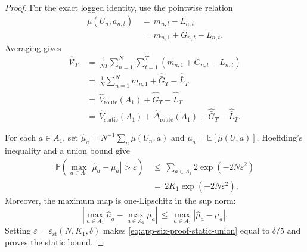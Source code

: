 \documentclass{article} %
\begin{document}
\begin{proof}
For the exact logged identity, use the pointwise relation
\begin{equation}
\label{eq:app-six-proof-sample-pointwise}
\begin{aligned}
\mu(U_n,a_{n,t})
&\,=\,
m_{n,t}-L_{n,t}
\\
&\,=\,
m_{n,1}+G_{n,t}-L_{n,t}.
\end{aligned}
\end{equation}
Averaging gives
\begin{equation}
\label{eq:app-six-proof-sample-average}
\begin{aligned}
\widehat{\mathcal{V}}_T
&\,=\,
\frac{1}{NT}\sum_{n=1}^{N}\sum_{t=1}^{T}
\left(m_{n,1}+G_{n,t}-L_{n,t}\right)
\\
&\,=\,
\frac{1}{N}\sum_{n=1}^{N}m_{n,1}
+
\widehat{\bar G}_T
-
\widehat{\bar L}_T
\\
&\,=\,
\widehat V_{\mathrm{route}}(A_1)
+
\widehat{\bar G}_T
-
\widehat{\bar L}_T
\\
&\,=\,
\widehat V_{\mathrm{static}}(A_1)
+
\widehat\Delta_{\mathrm{route}}(A_1)
+
\widehat{\bar G}_T
-
\widehat{\bar L}_T.
\end{aligned}
\end{equation}

For each \(a\in A_1\), set
\(\widehat\mu_a=N^{-1}\sum_n\mu(U_n,a)\) and
\(\mu_a=\mathbb E[\mu(U,a)]\). Hoeffding's inequality and a union bound give
\begin{equation}
\label{eq:app-six-proof-static-union}
\begin{aligned}
\mathbb{P}\!\left(
\max_{a\in A_1}|\widehat\mu_a-\mu_a|>\varepsilon
\right)
&\,\le\,
\sum_{a\in A_1}
2\exp(-2N\varepsilon^2)
\\
&\,=\,
2K_1\exp(-2N\varepsilon^2).
\end{aligned}
\end{equation}
Moreover, the maximum map is one-Lipschitz in the sup norm:
\begin{equation}
\left|
\max_{a\in A_1}\widehat\mu_a
-
\max_{a\in A_1}\mu_a
\right|
\,\leq\,
\max_{a\in A_1}|\widehat\mu_a-\mu_a|.
\end{equation}
Setting \(\varepsilon=\varepsilon_{\mathrm{st}}(N,K_1,\delta)\) makes
\eqref{eq:app-six-proof-static-union} equal to \(\delta/5\) and proves the
static bound.


\end{proof}
\end{document}

